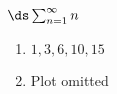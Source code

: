 {$\ds \sum_{n=1}^\infty n$
}
{\begin{enumerate}
\item	$1,3,6,10,15$
\item	Plot omitted
\end{enumerate}
}
